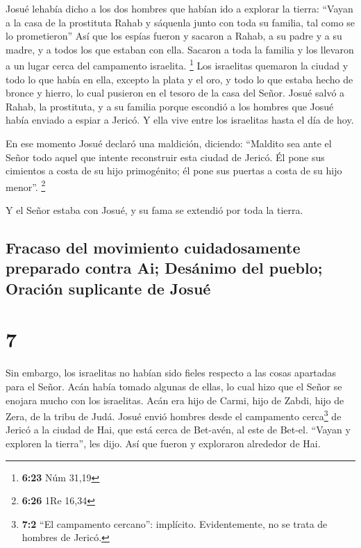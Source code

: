  Josué lehabía dicho a los dos hombres que habían ido a
explorar la tierra: ``Vayan a la casa de la prostituta Rahab y sáquenla
junto con toda su familia, tal como se lo prometieron'' 
Así que los espías fueron y sacaron a Rahab, a su padre y a su madre, y
a todos los que estaban con ella. Sacaron a toda la familia y los
llevaron a un lugar cerca del campamento israelita. \footnote{\textbf{6:23}
  Núm 31,19}  Los israelitas quemaron la ciudad y todo lo
que había en ella, excepto la plata y el oro, y todo lo que estaba hecho
de bronce y hierro, lo cual pusieron en el tesoro de la casa del Señor.
 Josué salvó a Rahab, la prostituta, y a su familia
porque escondió a los hombres que Josué había enviado a espiar a Jericó.
Y ella vive entre los israelitas hasta el día de hoy.

 En ese momento Josué declaró una maldición, diciendo:
``Maldito sea ante el Señor todo aquel que intente reconstruir esta
ciudad de Jericó. Él pone sus cimientos a costa de su hijo primogénito;
él pone sus puertas a costa de su hijo menor''. \footnote{\textbf{6:26}
  1Re 16,34}

 Y el Señor estaba con Josué, y su fama se extendió por
toda la tierra.

\hypertarget{fracaso-del-movimiento-cuidadosamente-preparado-contra-ai-desuxe1nimo-del-pueblo-oraciuxf3n-suplicante-de-josuuxe9}{%
\subsection{Fracaso del movimiento cuidadosamente preparado contra Ai;
Desánimo del pueblo; Oración suplicante de
Josué}\label{fracaso-del-movimiento-cuidadosamente-preparado-contra-ai-desuxe1nimo-del-pueblo-oraciuxf3n-suplicante-de-josuuxe9}}

\hypertarget{section-6}{%
\section{7}\label{section-6}}

 Sin embargo, los israelitas no habían sido fieles
respecto a las cosas apartadas para el Señor. Acán había tomado algunas
de ellas, lo cual hizo que el Señor se enojara mucho con los israelitas.
Acán era hijo de Carmi, hijo de Zabdi, hijo de Zera, de la tribu de
Judá.  Josué envió hombres desde el campamento
cerca\footnote{\textbf{7:2} ``El campamento cercano'': implícito.
  Evidentemente, no se trata de hombres de Jericó.} de Jericó a la
ciudad de Hai, que está cerca de Bet-avén, al este de Bet-el. ``Vayan y
exploren la tierra'', les dijo. Así que fueron y exploraron alrededor de
Hai.

